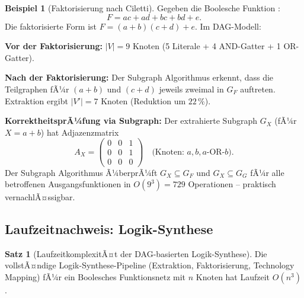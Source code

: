 ﻿\documentclass[a4paper,12pt]{article}
\theoremstyle{definition}
\newtheorem{beispiel}{Beispiel}
\newtheorem{satz}{Satz}
\begin{document}
\begin{beispiel}[Faktorisierung nach Ciletti]\label{bsp:faktorisierung}
  Gegeben die Boolesche Funktion \cite[S.~240, Beispiel 6.3]{ciletti2011}:
  \[
    F = ac + ad + bc + bd + e.
  \]
  Die faktorisierte Form ist $F = (a + b)(c + d) + e$. Im DAG-Modell:

  \textbf{Vor der Faktorisierung:} $|V| = 9$ Knoten
  (5 Literale + 4 AND-Gatter + 1 OR-Gatter).

  \textbf{Nach der Faktorisierung:} Der Subgraph Algorithmus erkennt, dass die
  Teilgraphen fÃ¼r $(a + b)$ und $(c + d)$ jeweils zweimal in $G_F$ auftreten.
  Extraktion ergibt $|V'| = 7$ Knoten (Reduktion um $22\,\%$).

  \textbf{KorrektheitsprÃ¼fung via Subgraph:} Der extrahierte Subgraph
  $G_X$ (fÃ¼r $X = a+b$) hat Adjazenzmatrix
  \[
    A_X = \begin{pmatrix} 0 & 0 & 1 \\ 0 & 0 & 1 \\ 0 & 0 & 0 \end{pmatrix}
    \quad \text{(Knoten: } a, b, a\text{-OR-}b\text{)}.
  \]
  Der Subgraph Algorithmus Ã¼berprÃ¼ft $G_X \subseteq G_F$ und $G_X \subseteq G_G$ fÃ¼r
  alle betroffenen Ausgangsfunktionen in $O(9^3) = 729$ Operationen -- praktisch
  vernachlÃ¤ssigbar.
\end{beispiel}

\subsection{Laufzeitnachweis: Logik-Synthese}

\begin{satz}[LaufzeitkomplexitÃ¤t der DAG-basierten Logik-Synthese]\label{satz:synthese_lz}
  Die vollstÃ¤ndige Logik-Synthese-Pipeline (Extraktion, Faktorisierung, Technology
  Mapping) fÃ¼r ein Boolesches Funktionsnetz mit $n$ Knoten hat Laufzeit $O(n^3)$.
\end{satz}
\end{document}
